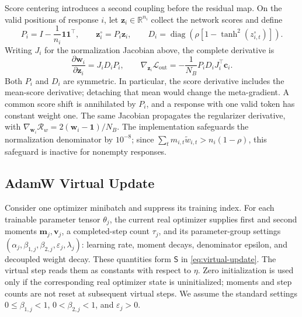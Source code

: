 \documentclass{article}
\theoremstyle{plain}
\theoremstyle{definition}
\theoremstyle{remark}
\begin{document}
Score centering introduces a second coupling before the residual map. On the valid positions
of response \(i\), let \(\boldsymbol z_i\in\mathbb R^{n_i}\) collect the network scores and define
\[
 P_i=I-\frac{1}{n_i}\boldsymbol 1\boldsymbol 1^\top,
 \qquad \boldsymbol z_i^\circ=P_i\boldsymbol z_i,
 \qquad D_i=\operatorname{diag}\!\left(\rho[1-\tanh^2(z_{i,t}^\circ)]\right).
\]
Writing \(J_i\) for the normalization Jacobian above, the complete derivative is
\begin{equation}
 \frac{\partial\boldsymbol w_i}{\partial\boldsymbol z_i}=J_iD_iP_i,
 \qquad
 \nabla_{\boldsymbol z_i}\mathcal L_{\mathrm{out}}
 =-\frac{1}{N_B}P_iD_iJ_i^\top\boldsymbol c_i.
 \label{eq:centered-score-jacobian}
\end{equation}
Both \(P_i\) and \(D_i\) are symmetric. In particular, the score derivative includes the
mean-score derivative; detaching that mean would change the meta-gradient. A common score
shift is annihilated by \(P_i\), and a response with one valid token has constant weight one.
The same Jacobian propagates the regularizer derivative, with
\(\nabla_{\boldsymbol w_i}\mathcal R_w=2(\boldsymbol w_i-\boldsymbol 1)/N_B\).
The implementation safeguards the normalization denominator by \(10^{-8}\); since
\(\sum_t m_{i,t}\widetilde w_{i,t}>n_i(1-\rho)\), this safeguard is inactive for nonempty responses.

\subsection{AdamW Virtual Update}
\label{app:virtual-adamw}

Consider one optimizer minibatch and suppress its training index. For each trainable parameter
tensor \(\theta_j\), the current real optimizer supplies first and second moments
\(\boldsymbol m_j,\boldsymbol v_j\), a completed-step count \(\tau_j\), and its parameter-group
settings \((\alpha_j,\beta_{1,j},\beta_{2,j},\varepsilon_j,\lambda_j)\): learning rate, moment
decays, denominator epsilon, and decoupled weight decay. These quantities form \(\mathsf S\) in
\cref{eq:virtual-update}. The virtual step reads them as constants with respect to \(\eta\).
Zero initialization is used only if the corresponding real optimizer state is uninitialized;
moments and step counts are not reset at subsequent virtual steps. We assume the standard
settings \(0\leq\beta_{1,j}<1\), \(0<\beta_{2,j}<1\), and \(\varepsilon_j>0\).
\end{document}
